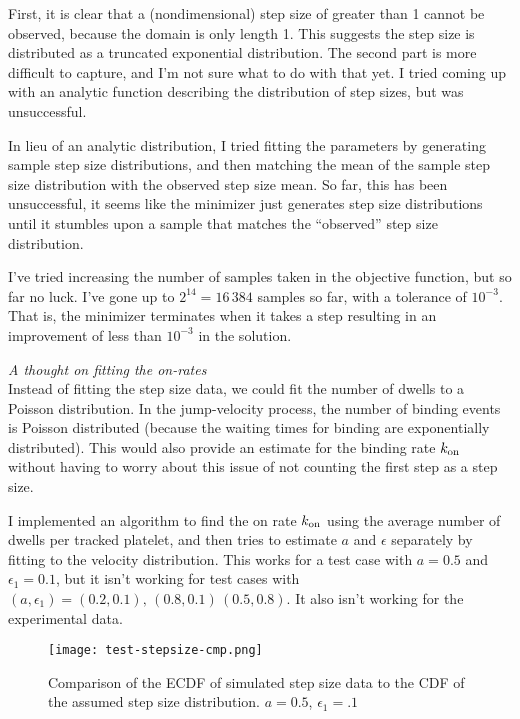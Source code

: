 \documentclass{article}
\newcommand{\tn}{\textnormal}
\begin{document}
First, it is clear that a (nondimensional) step size of greater than 1
cannot be observed, because the domain is only length 1. This suggests
the step size is distributed as a truncated exponential
distribution. The second part is more difficult to capture, and I'm
not sure what to do with that yet. I tried coming up with an analytic
function describing the distribution of step sizes, but was
unsuccessful.

In lieu of an analytic distribution, I tried fitting the parameters by
generating sample step size distributions, and then matching the mean
of the sample step size distribution with the observed step size
mean. So far, this has been unsuccessful, it seems like the minimizer
just generates step size distributions until it stumbles upon a sample
that matches the ``observed'' step size distribution.

I've tried increasing the number of samples taken in the objective
function, but so far no luck. I've gone up to $2^{14} = 16\,384$
samples so far, with a tolerance of $10^{-3}$. That is, the minimizer
terminates when it takes a step resulting in an improvement of less
than $10^{-3}$ in the solution.

\emph{A thought on fitting the on-rates}\\
Instead of fitting the step size data, we could fit the number of
dwells to a Poisson distribution. In the jump-velocity process, the
number of binding events is Poisson distributed (because the waiting
times for binding are exponentially distributed). This would also
provide an estimate for the binding rate $k_\tn{on}$ without having to
worry about this issue of not counting the first step as a step size.

I implemented an algorithm to find the on rate $k_\tn{on}$ using the
average number of dwells per tracked platelet, and then tries to
estimate $a$ and $\epsilon$ separately by fitting to the velocity
distribution. This works for a test case with $a=0.5$ and $\epsilon_1
= 0.1$, but it isn't working for test cases with $(a, \epsilon_1) =
(0.2, 0.1), \, (0.8, 0.1)\, (0.5, 0.8)$. It also isn't working for the
experimental data.

\begin{figure}
  \centering
  \texttt{[image: test-stepsize-cmp.png]}
  \caption{Comparison of the ECDF of simulated step size data to the
    CDF of the assumed step size distribution. $a = 0.5$, $\epsilon_1
    = .1$}
  \label{fig:test-stepsize-cmp}
\end{figure}

% 
% 
\end{document}
